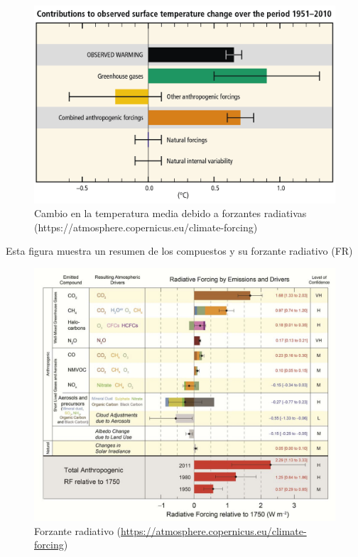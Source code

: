 \documentclass[]{book}
\begin{document}
\begin{figure}
\includegraphics[width=20.5in]{figs/SPM.03-01} \caption{Cambio en la temperatura media debido a forzantes radiativas (https://atmosphere.copernicus.eu/climate-forcing)}\label{fig:unnamed-chunk-17}
\end{figure}

Esta figura muestra un resumen de los compuestos y su forzante radiativo (FR) \citep{stocker2014climate}

\begin{figure}
\centering
\includegraphics{figs/ipcc.jpg}
\caption{\label{fig:unnamed-chunk-18}Forzante radiativo (\url{https://atmosphere.copernicus.eu/climate-forcing})}
\end{figure}
\end{document}
